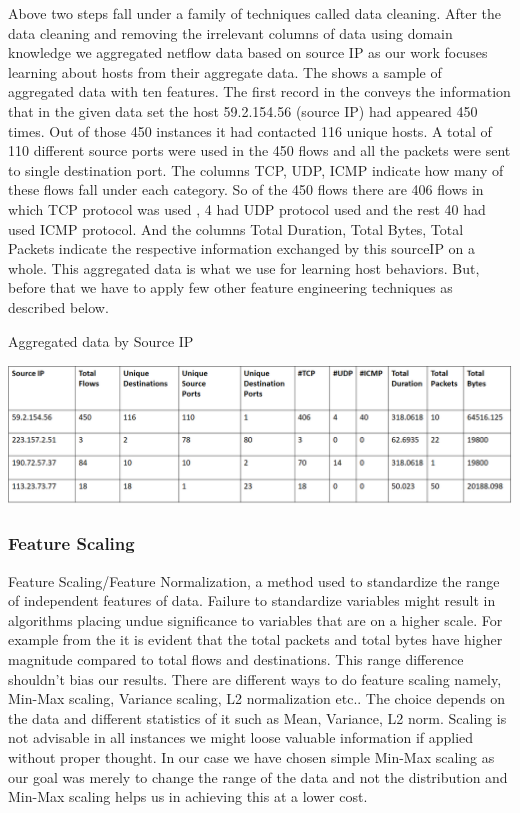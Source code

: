 Above two steps fall under a family of techniques called data cleaning. After the data cleaning and removing the irrelevant columns of data using domain knowledge we aggregated netflow data based on source IP as our work focuses learning about hosts from their aggregate data. The  shows a sample of aggregated data with ten features.
The first record in the  conveys the information that in the given data set the host 59.2.154.56 (source IP) had appeared 450 times. Out of those 450 instances it had contacted 116 unique hosts. A total of 110 different source ports were used in the 450 flows and all the packets were sent to single destination port. The columns TCP, UDP, ICMP indicate how many of these flows fall under each category. So of the 450 flows there are 406 flows in which TCP protocol was used , 4 had UDP protocol used and the rest 40 had used ICMP protocol. And the columns Total Duration, Total Bytes, Total Packets indicate the respective information exchanged by this sourceIP on a whole. This aggregated data is what we use for learning host behaviors. But, before that we have to apply few other feature engineering techniques as described below.

\begin{table}[b]
	\caption{Aggregated data by Source IP}%
	\centerline{\includegraphics[scale = 0.6]{aggregated.png}}	
\end{table}


\subsubsection{Feature Scaling} 
Feature Scaling/Feature Normalization, a method used to standardize the range of independent features of data. Failure to standardize variables might result in algorithms placing undue significance to variables that are on a higher scale. For example from the  it is evident that the total packets and total bytes have higher magnitude compared to total flows and destinations. This range difference shouldn't bias our results.
There are different ways to do feature scaling namely, Min-Max scaling, Variance scaling, L2 normalization etc.. The choice depends on the data and different statistics of it such as Mean, Variance, L2 norm. Scaling is not advisable in all instances we might	loose valuable information if applied without proper thought. In our case we have chosen simple Min-Max scaling as our goal was merely to change the range of the data and not the distribution and Min-Max scaling helps us in achieving this at a lower cost.

